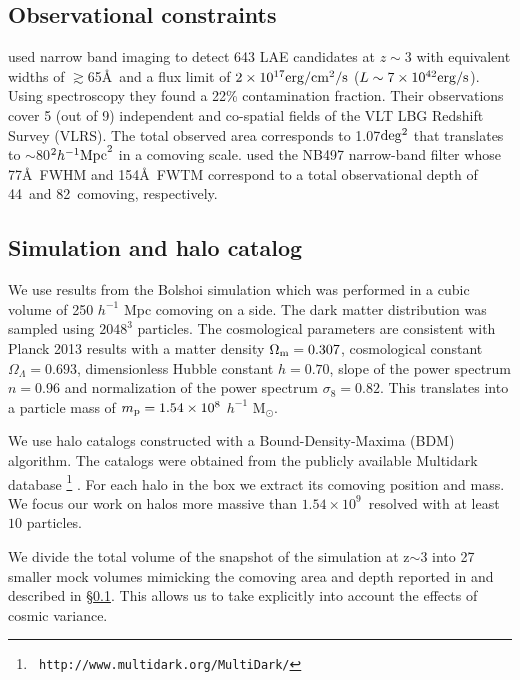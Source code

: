 \documentclass{emulateapj}
\newcommand{\hMpc}{{\ifmmode{h^{-1}{\rm Mpc}}\else{$h^{-1}$Mpc}\fi}}
\newcommand{\hMsun}{{\ifmmode{h^{-1}{\rm {M_{\odot}}}}\else{$h^{-1}{\rm{M_{\odot}}}$}\fi}}
\begin{document}
\subsection{Observational constraints}
\label{subsec:obs}
\citet{Bielby16} used narrow band imaging to detect 643 LAE candidates
at $z\sim 3$  with equivalent widths of $\gtrsim$65\AA\ and a flux limit
of $2\times10^{17}{\rm erg/cm^2/s}$ ($L\sim 7\times10^{42}{\rm erg/s} $). 
Using spectroscopy they found a 22\% contamination fraction.
Their observations cover 5 (out of 9) independent and co-spatial fields of the VLT LBG Redshift Survey (VLRS). 
The  total observed  area corresponds to 1.07$\rm deg^2$ that translates to
$\sim$80$^2\hMpc^2$ in a comoving scale. \citet{Bielby16} used the
NB497  narrow-band filter whose 77\AA\ FWHM and 154\AA\ FWTM correspond to a total observational depth of 44\hMpc\  and 82\hMpc\ comoving, respectively.


\subsection{Simulation and halo catalog}
\label{subsec:sim}

We use results from the  Bolshoi simulation \citep{Bolshoi} which was performed in a cubic volume of 250 $h^{-1}$ Mpc comoving on a side. The dark matter distribution was sampled using  $2048^{3}$ particles. The cosmological parameters are consistent with Planck 2013 results \citep{Planck2014} with a matter density
$\Omega_{\rm m} = 0.307$, cosmological constant
$\Omega_{\Lambda}=0.693$, dimensionless Hubble constant $h=0.70$, slope
of the power spectrum  $n=0.96$ and normalization of the power
spectrum $\sigma_{8}=0.82$.  
This translates into a particle mass of  $m_{\rm p}=1.54\times 10^{8}$ $h^{-1}$ M$_{\odot}$.  

We use halo catalogs constructed with a Bound-Density-Maxima (BDM) algorithm. The catalogs were obtained from the publicly available
Multidark database  \footnote{{\tt
    http://www.multidark.org/MultiDark/}} \citep{MultiDark}. For each
halo in the box we extract its comoving position and mass. 
We focus our work on halos more massive than $1.54\times 10^{9}$\hMsun\ resolved with at least  $10$ particles.

We divide the total volume of the snapshot of the simulation at z$\sim$3
into  27 smaller mock volumes mimicking the  comoving area and depth  
reported in \citet{Bielby16} and described in \S \ref{subsec:obs}. 
This allows  us to take explicitly into account the effects of cosmic variance.
\end{document}
